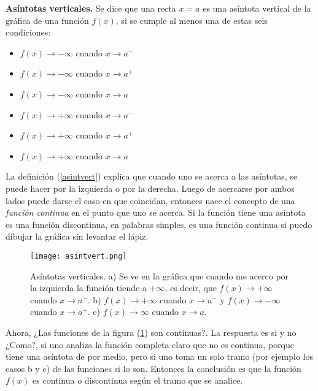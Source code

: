 \begin{mydef}
\label{asintvert}
\textbf{Asíntotas verticales. } Se dice que una recta $x=a$ es una asíntota vertical de la gráfica de una función $f(x)$, si se cumple al menos una de estas seis condiciones:
\begin{itemize}
	\item $f(x)\rightarrow -\infty$ cuando $x\rightarrow a^{-}$ \\
	\item $f(x)\rightarrow -\infty$ cuando $x\rightarrow a^{+}$ \\
	\item $f(x)\rightarrow -\infty$ cuando $x\rightarrow a$ \\
	\item $f(x)\rightarrow +\infty$ cuando $x\rightarrow a^{-}$ \\
	\item $f(x)\rightarrow +\infty$ cuando $x\rightarrow a^{+}$ \\
	\item $f(x)\rightarrow +\infty$ cuando $x\rightarrow a$ \\
\end{itemize}
\end{mydef}

La definición (\ref{asintvert}) explica que cuando uno se acerca a las asíntotas, se puede hacer por la izquierda o por la derecha. Luego de acercarse por ambos lados puede darse el caso en que coincidan, entonces nace el concepto de una \textit{función continua} en el punto que uno se acerca. Si la función tiene una asíntota es una función discontinua, en palabras simples, es una función continua si puedo dibujar la gráfica sin levantar el lápiz.

 \begin{center}
\begin{figure}[h!]
\centering
\texttt{[image: asintvert.png]}
\caption[Asíntotas verticales.]{Asíntotas verticales. a) Se ve en la gráfica que cuando me acerco por la izquierda la función tiende a $+\infty$, es decir, que $f(x)\rightarrow +\infty$ cuando $x\rightarrow a^{-}$.  b) $f(x)\rightarrow +\infty$ cuando $x\rightarrow a^{-}$ y $f(x)\rightarrow -\infty$ cuando $x\rightarrow a^{+}$. c) $f(x)\rightarrow \infty$ cuando $x\rightarrow a$. } \label{asintvert0}
\end{figure}
\end{center}

Ahora, ¿Las funciones de la figura (\ref{asintvert0}) son continuas?. La respuesta es si y no ¿Como?, si uno analiza la función completa claro que no es continua, porque tiene una asíntota de por medio, pero si uno toma un solo tramo (por ejemplo los casos b y c) de las funciones si lo son. Entonces la conclusión es que la función $f(x)$ es continua o discontinua según el tramo que se analice.

